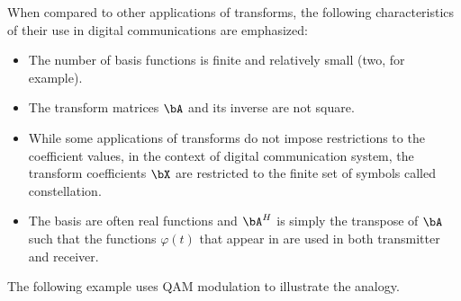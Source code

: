 When compared to other applications of transforms, the following characteristics of their use in digital communications are emphasized:
\begin{itemize}
\item The number of basis functions is finite and relatively small (two, for example).

\item  The transform matrices $\bA$ and its inverse are not square. 



\item While some applications of transforms do not impose restrictions to the coefficient values, in the context of digital communication system, the transform coefficients $\bX$ are restricted to the finite set of symbols called constellation.

\item
The basis are often real functions and $\bA^H$ is simply the transpose of $\bA$ such that the functions $\varphi(t)$ that appear in  are used in both transmitter and receiver.
\end{itemize}


The following example uses QAM modulation to illustrate the analogy.

